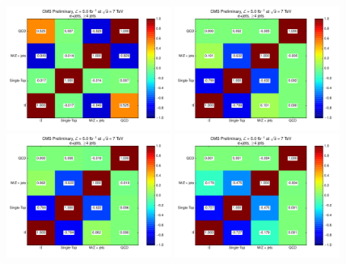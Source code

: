 \begin{figure}[H]
    \centering
     \includegraphics[width=0.48\textwidth]{Chapters/04_Analysis/04b_XSections/images/fitchecks/7TeV/Correlations_electron_MET_0-27.pdf}\hfill
     \includegraphics[width=0.48\textwidth]{Chapters/04_Analysis/04b_XSections/images/fitchecks/7TeV/Correlations_electron_MET_27-52.pdf}\\
	 \includegraphics[width=0.48\textwidth]{Chapters/04_Analysis/04b_XSections/images/fitchecks/7TeV/Correlations_electron_MET_52-87.pdf}\hfill
	 \includegraphics[width=0.48\textwidth]{Chapters/04_Analysis/04b_XSections/images/fitchecks/7TeV/Correlations_electron_MET_87-130.pdf}\\

\end{figure}
